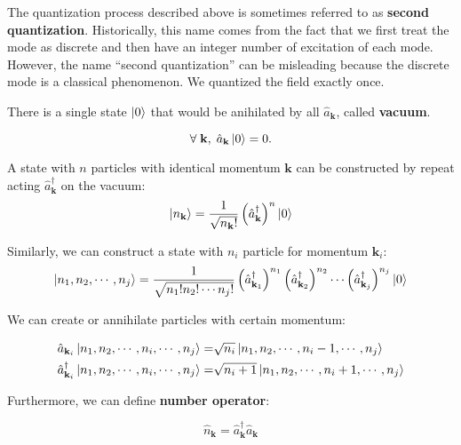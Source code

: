 \documentclass[12pt]{article}
\numberwithin{equation}{subsection}
\theoremstyle{mystyle}{\newtheorem{definition}{Definition}[subsection]}
\theoremstyle{mystyle}{\newtheorem{theorem}[definition]{Theorem}}
\theoremstyle{mystyle}{\newtheorem*{remark}{Remark}}
\theoremstyle{mystyle}{\newtheorem{example}{Example}[subsection]}
\theoremstyle{mystyle}{\newtheorem{examples}{Examples}[subsection]}
\theoremstyle{mystyle}{\newtheorem{cthm}{}[subsection]}
\newcommand{\tbf}[1]{\textbf{#1}}
\begin{document}
\begin{remark}
  The quantization process described above is sometimes referred to as \tbf{second quantization}. Historically, this name
  comes from the fact that we first treat the mode as discrete and then have an integer number of excitation of each mode.
  However, the name ``second quantization'' can be misleading because the discrete mode is a classical phenomenon.
  We quantized the field exactly once.
\end{remark}


There is a single state \(\ket{0}\) that would be anihilated by all \(\hat{a}_{\mathbf{k}}\), called \tbf{vacuum}.
\begin{definition}[Vacuum]
  \[\forall\; \mathbf{k},\; \hat{a}_{\mathbf{k}}\ket{0}=0.\]
\end{definition}

A state with \(n\) particles with identical momentum \(\mathbf{k}\) can be constructed by repeat acting \(\hat{a}^{\dagger}_{\mathbf{k}}\)
on the vacuum:
\begin{equation}
  \ket{n_{\mathbf{k}}}=\frac{1}{\sqrt{n_{\mathbf{k}}!}}\left(\hat{a}^{\dagger}_{\mathbf{k}}\right)^{n}\ket{0}
\end{equation}

Similarly, we can construct a state with \(n_{i}\) particle for momentum \(\mathbf{k}_i\):
\begin{equation}
  \ket{n_1,n_2,\cdots,n_j}=\frac{1}{\sqrt{n_1!n_2!\cdots n_j!}}\left(\hat{a}^{\dagger}_{\mathbf{k}_1}\right)^{n_1}
  \left(\hat{a}^{\dagger}_{\mathbf{k}_2}\right)^{n_2}\cdots \left(\hat{a}^{\dagger}_{\mathbf{k}_j}\right)^{n_j}\ket{0}
\end{equation}

We can create or annihilate particles with certain momentum:
\begin{example}
  \begin{align*}
    \hat{a}_{\mathbf{k}_i}\ket{n_1,n_2,\cdots,n_i,\cdots,n_j}=           & \sqrt{n_i}\ket{n_1,n_2,\cdots,n_i-1,\cdots,n_j}   \\
    \hat{a}^{\dagger}_{\mathbf{k}_i}\ket{n_1,n_2,\cdots,n_i,\cdots,n_j}= & \sqrt{n_i+1}\ket{n_1,n_2,\cdots,n_i+1,\cdots,n_j} \\
  \end{align*}
\end{example}

Furthermore, we can define \tbf{number operator}:
\begin{definition}
  \[\hat{n}_{\mathbf{k}}=\hat{a}^\dagger_{\mathbf{k}}\hat{a}_{\mathbf{k}}\]
\end{definition}
\end{document}
